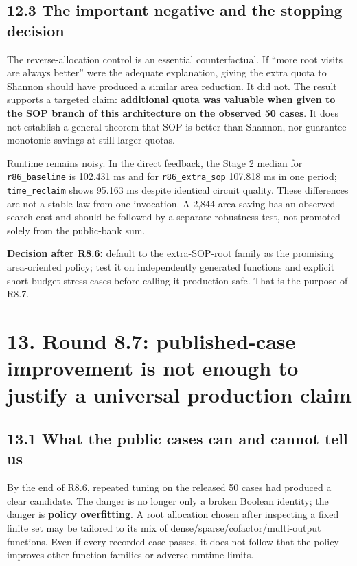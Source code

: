 \documentclass[a4paper,10pt]{article}
\theoremstyle{definition}
\theoremstyle{remark}
\begin{document}
\subsection{12.3 The important negative and the stopping decision}\label{the-important-negative-and-the-stopping-decision}

The reverse-allocation control is an essential counterfactual. If ``more root visits are always better'' were the adequate explanation, giving the extra quota to Shannon should have produced a similar area reduction. It did not. The result supports a targeted claim: \textbf{additional quota was valuable when given to the SOP branch of this architecture on the observed 50 cases}. It does not establish a general theorem that SOP is better than Shannon, nor guarantee monotonic savings at still larger quotas.

Runtime remains noisy. In the direct feedback, the Stage 2 median for \texttt{r86\_baseline} is 102.431 ms and for \texttt{r86\_extra\_sop} 107.818 ms in one period; \texttt{time\_reclaim} shows 95.163 ms despite identical circuit quality. These differences are not a stable law from one invocation. A 2,844-area saving has an observed search cost and should be followed by a separate robustness test, not promoted solely from the public-bank sum.

\begin{tcolorbox}[colback=ResearchBlue!6!white,colframe=ResearchSlate!55!white,boxrule=0.65pt,arc=1mm,breakable]
\textbf{Decision after R8.6:} default to the extra-SOP-root family as the promising area-oriented policy; test it on independently generated functions and explicit short-budget stress cases before calling it production-safe. That is the purpose of R8.7.
\end{tcolorbox}

\section{13. Round 8.7: published-case improvement is not enough to justify a universal production claim}\label{round-8.7-published-case-improvement-is-not-enough-to-justify-a-universal-production-claim}

\subsection{13.1 What the public cases can and cannot tell us}\label{what-the-public-cases-can-and-cannot-tell-us}

By the end of R8.6, repeated tuning on the released 50 cases had produced a clear candidate. The danger is no longer only a broken Boolean identity; the danger is \textbf{policy overfitting}. A root allocation chosen after inspecting a fixed finite set may be tailored to its mix of dense/sparse/cofactor/multi-output functions. Even if every recorded case passes, it does not follow that the policy improves other function families or adverse runtime limits.
\end{document}
